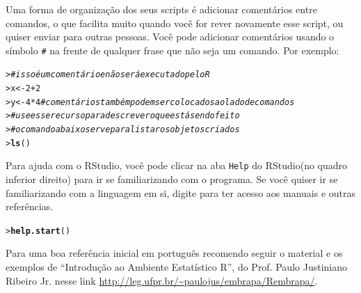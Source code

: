 \documentclass[a4paper,12pt]{article}\usepackage[]{graphicx}\usepackage[]{color}
\makeatletter
\newcommand{\hlnum}[1]{\textcolor[rgb]{0.686,0.059,0.569}{#1}}%
\newcommand{\hlcom}[1]{\textcolor[rgb]{0.678,0.584,0.686}{\textit{#1}}}%
\newcommand{\hlopt}[1]{\textcolor[rgb]{0,0,0}{#1}}%
\newcommand{\hlstd}[1]{\textcolor[rgb]{0.345,0.345,0.345}{#1}}%
\newcommand{\hlkwb}[1]{\textcolor[rgb]{0.69,0.353,0.396}{#1}}%
\newcommand{\hlkwd}[1]{\textcolor[rgb]{0.737,0.353,0.396}{\textbf{#1}}}%
\newenvironment{kframe}{%
 \def\at@end@of@kframe{}%
 \ifinner\ifhmode%
  \def\at@end@of@kframe{\end{minipage}}%
  \begin{minipage}{\columnwidth}%
 \fi\fi%
 \def\FrameCommand##1{\hskip\@totalleftmargin \hskip-\fboxsep
 \colorbox{shadecolor}{##1}\hskip-\fboxsep
     \hskip-\linewidth \hskip-\@totalleftmargin \hskip\columnwidth}%
 \MakeFramed {\advance\hsize-\width
   \@totalleftmargin\z@ \linewidth\hsize
   \@setminipage}}%
 {\par\unskip\endMakeFramed%
 \at@end@of@kframe}
\newenvironment{knitrout}{}{} %
\providecommand{\R}{\textsf{R}\xspace}
\providecommand{\RStudio}{\textsf{RStudio}\xspace}
\makeatother
\begin{document}
Uma forma de organização dos seus scripts é adicionar comentários entre
comandos, o que facilita muito quando você for rever novamente esse
script, ou quiser enviar para outras pessoas. Você pode adicionar
comentários usando o símbolo \texttt{\#} na frente de qualquer frase que
não seja um comando. Por exemplo:

\begin{knitrout}\small
{}\color{fgcolor}\begin{kframe}
\begin{alltt}
\hlstd{> }\hlcom{# isso é um comentário e não será executado pelo R}
\hlstd{> }\hlstd{x} \hlkwb{<-} \hlnum{2} \hlopt{+} \hlnum{2}
\hlstd{> }\hlstd{y} \hlkwb{<-} \hlnum{4} \hlopt{*} \hlnum{4} \hlcom{# comentários também podem ser colocados ao lado de comandos}
\hlstd{> }\hlcom{# use esse recurso para descrever o que está sendo feito}
\hlstd{> }\hlcom{# o comando abaixo serve para listar os objetos criados}
\hlstd{> }\hlkwd{ls}\hlstd{()}
\end{alltt}
\end{kframe}
\end{knitrout}

Para ajuda com o \RStudio, você pode clicar na aba \texttt{Help} do
\RStudio (no quadro inferior direito) para ir se familiarizando com o
programa. Se você quiser ir se familiarizando com a linguagem em si,
digite para ter acesso aos manuais e outras referências.

\begin{knitrout}\small
{}\color{fgcolor}\begin{kframe}
\begin{alltt}
\hlstd{> }\hlkwd{help.start}\hlstd{()}
\end{alltt}
\end{kframe}
\end{knitrout}

Para uma boa referência inicial em português recomendo seguir o material
e os exemplos de ``Introdução ao Ambiente Estatístico R'', do
Prof. Paulo Justiniano Ribeiro Jr. nesse link
\url{http://leg.ufpr.br/~paulojus/embrapa/Rembrapa/}.


\end{document}
